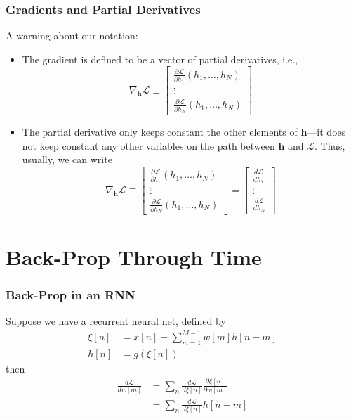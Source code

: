 \documentclass{beamer}
\begin{document}
\begin{frame}
  \frametitle{Gradients and Partial Derivatives}

  A warning about our notation:
  \begin{itemize}
  \item The gradient is defined to be a vector of partial derivatives, i.e.,
    \begin{displaymath}
      \nabla_{\bm{h}}\mathcal{L}\equiv
      \left[\begin{array}{c}
          \frac{\partial\mathcal{L}}{\partial h_1}(h_1,\ldots,h_N)\\
          \vdots\\
          \frac{\partial\mathcal{L}}{\partial h_N}(h_1,\ldots,h_N)
        \end{array}
        \right]
    \end{displaymath}
  \item The partial derivative only keeps constant the other elements
    of $\bm{h}$---it does not keep constant any other variables on the
    path between $\bm{h}$ and $\mathcal{L}$.  Thus, usually, we can write
    \begin{displaymath}
      \nabla_{\bm{h}}\mathcal{L}\equiv
      \left[\begin{array}{c}
          \frac{\partial\mathcal{L}}{\partial h_1}(h_1,\ldots,h_N)\\
          \vdots\\
          \frac{\partial\mathcal{L}}{\partial h_N}(h_1,\ldots,h_N)
        \end{array}
        \right]=
      \left[\begin{array}{c}
          \frac{d\mathcal{L}}{d h_1}\\
          \vdots\\
          \frac{d\mathcal{L}}{dh_N}
        \end{array}
        \right]
    \end{displaymath}
  \end{itemize}
\end{frame}


\section[BPTT]{Back-Prop Through Time}
\setcounter{subsection}{1}

\begin{frame}
  \frametitle{Back-Prop in an RNN}
  Suppose we have a recurrent neural net, defined by
  \begin{align*}
    \xi[n] &= x[n] + \sum_{m=1}^{M-1}w[m]h[n-m]\\
    h[n] &= g\left(\xi[n]\right)
  \end{align*}
  then
  \begin{align*}
    \frac{d{\mathcal L}}{dw[m]}
    & =\sum_n \frac{d{\mathcal L}}{d\xi[n]} \frac{\partial\xi[n]}{\partial w[m]}\\
    & =\sum_n \frac{d{\mathcal L}}{d\xi[n]} h[n-m]\\
  \end{align*}
\end{frame}
\end{document}
